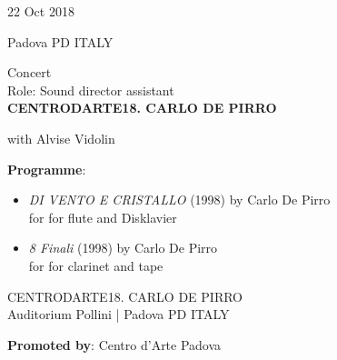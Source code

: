 \documentclass[7pt,a4paper]{article}
\begin{document}
\begin{mdframed}[
    backgroundcolor=entrygray,
    linecolor=entrygray,
    linewidth=0pt,
    innerleftmargin=6pt,
    innerrightmargin=6pt,
    innertopmargin=6pt,
    innerbottommargin=6pt,
    skipabove=0pt,
    skipbelow=0pt
]

\begin{minipage}[t]{0.28\textwidth}

22 Oct 2018

\scriptsize Padova PD ITALY


\end{minipage}
\begin{minipage}[t]{0.68\textwidth}
\small Concert
\\\scriptsize Role: Sound director assistant
\\ \normalsize \textbf{CENTRODARTE18. CARLO DE PIRRO}

\par\scriptsize with Alvise Vidolin
\vspace{0.25cm}

\par \scriptsize \textbf{Programme}:\par
\begin{itemize}

\item \textit{DI VENTO E CRISTALLO} (1998) by Carlo De Pirro\\ for for flute and Disklavier

\item \textit{8 Finali} (1998) by Carlo De Pirro\\ for for clarinet and tape

\end{itemize}
\vspace{0.2cm}



\small CENTRODARTE18. CARLO DE PIRRO\\Auditorium Pollini | \scriptsize Padova PD ITALY

\vspace{0.1cm}
\scriptsize

\vspace{0.1cm}
\par \textbf{Promoted by}: Centro d'Arte Padova
\end{minipage}
\vspace{0.25cm}
\end{mdframed}
\end{document}
